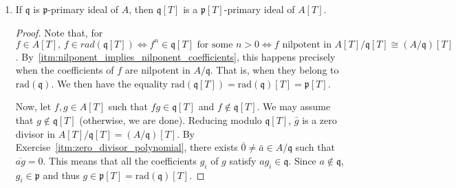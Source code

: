 \begin{problem}
\begin{enumerate}[label=(\theproblem.\arabic*),ref=\theproblem.\arabic*]
\begin{sol}
\begin{proof}
                Now, let $\mathfrak{p}$ be a minimal prime of $I$.
                $\mathfrak{p}[T]$ must contain a minimal prime of $I[T]$, say, $\mathfrak{p}'[T]$
                Then, we take the contraction $I \subseteq \mathfrak{p}' \subseteq \mathfrak{p}$
                and by definition of $\mathfrak{p}$ being a minimal of $I$,
                we conclude that $\mathfrak{p}' = \mathfrak{p}$ and $\mathfrak{p}'[T] = \mathfrak{p}[T]$.
                Thus, $\mathfrak{p}[T]$ is a minimal prime of $I[T]$.

            \end{proof}
        \end{sol}

        \item\label{itm:p_primary_implies_pt_primary} If $\mathfrak{q}$ is $\mathfrak{p}$-primary ideal of $A$, then $\mathfrak{q}[T]$ is a $\mathfrak{p}[T]$-primary ideal of $A[T]$.
        \begin{sol}

            \begin{proof}

            Note that, for $ f \in A[T], \, f \in rad(\mathfrak{q}[T]) \Leftrightarrow f^n \in \mathfrak{q}[T] \text{ for some } n > 0
            \Leftrightarrow f \text{ nilpotent in } A[T] / \mathfrak{q}[T] \cong (A/\mathfrak{q})[T]$.
            By~\ref{itm:nilponent_implies_nilponent_coefficients}, this happens precisely when
            the coefficients of $f$ are nilpotent in $A/\mathfrak{q}$.
            That is, when they belong to $\text{rad}(\mathfrak{q})$.
            We then have the equality $\text{rad}(\mathfrak{q}[T]) = \text{rad}(\mathfrak{q})[T] = \mathfrak{p}[T]$.

            Now, let $f,g \in A[T]$ such that $fg \in \mathfrak{q}[T]$ and $f \notin \mathfrak{q}[T]$.
            We may assume that $g \notin \mathfrak{q}[T]$ (otherwise, we are done).
            Reducing modulo $\mathfrak{q}[T]$, $\bar{g}$ is a zero divisor in ${A[T] / \mathfrak{q}[T] = (A/\mathfrak{q})[T]}$.
            By Exercise~\ref{itm:zero_divisor_polynomial}, there exists $\bar{0} \neq \bar{a} \in A/\mathfrak{q}$ such that $\overline{ag} = 0$.
            This means that all the coefficients $g_i$ of $g$ satisfy $ag_i \in \mathfrak{q}$.
            Since $a \notin \mathfrak{q}$, $g_i \in \mathfrak{p}$
            and thus $g \in \mathfrak{p}[T] = \text{rad}(\mathfrak{q})[T]$.







\end{proof}
\end{sol}
\end{enumerate}
\end{problem}
